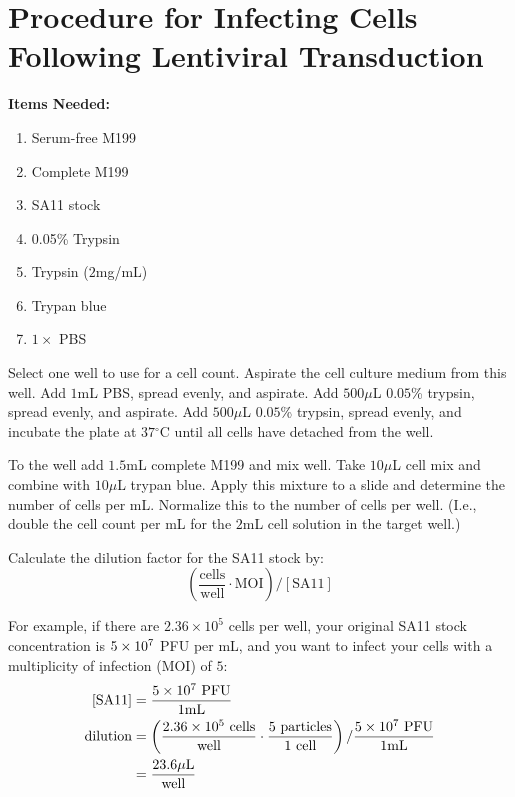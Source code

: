 \section{Procedure for Infecting Cells Following Lentiviral Transduction}

{\bfseries Items Needed:} \begin{enumerate}
	\item Serum-free M199
	\item Complete M199
	\item SA11 stock
	\item 0.05\% Trypsin
	\item Trypsin ($2$mg/mL)
	\item Trypan blue
	\item $1\times$ PBS
\end{enumerate}

Select one well to use for a cell count. Aspirate the cell culture medium from this well. Add $1$mL PBS, spread evenly, and aspirate. Add $500\mu$L $0.05$\% trypsin, spread evenly, and aspirate. Add $500\mu$L $0.05$\% trypsin, spread evenly, and incubate the plate at $37{^\circ}$C until all cells have detached from the well.

To the well add $1.5$mL complete M199 and mix well. Take $10\mu$L cell mix and combine with $10\mu$L trypan blue. Apply this mixture to a slide and determine the number of cells per mL. Normalize this to the number of cells per well. (I.e., double the cell count per mL for the $2$mL cell solution in the target well.)

Calculate the dilution factor for the SA11 stock by:
\begin{equation*}
\left(\frac{\text{cells}}{\text{well}}\cdot \text{MOI}\right)/\left[\text{SA11}\right]
\end{equation*}

For example, if there are $2.36\times 10^5$ cells per well, your original SA11 stock concentration is $5\times 10^{7}$ PFU per mL, and you want to infect your cells with a multiplicity of infection (MOI) of $5$:
\begin{align*}
\text{[SA11]} &= \frac{5\times 10^{7}\text{ PFU}}{1\text{mL}}\\
\text{dilution}&= \left(\frac{2.36\times 10^{5}\text{ cells}}{\text{well}}\cdot \frac{5\text{ particles}}{1\text{ cell}}\right)/\frac{5\times 10^{7}\text{ PFU}}{1\text{mL}}\\
&= \frac{23.6\mu\text{L}}{\text{well}}\\
\end{align*}

